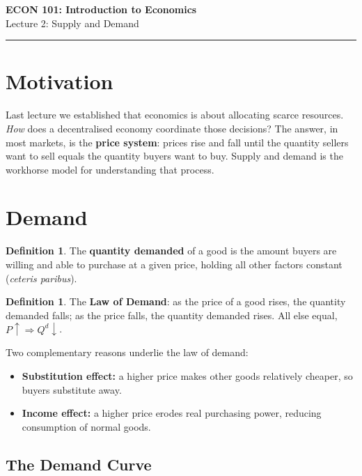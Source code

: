 \documentclass[11pt]{article}
\theoremstyle{definition}
\newtheorem{definition}[theorem]{Definition}
\theoremstyle{remark}
\newcommand{\Qd}{Q^{d}}
\begin{document}
\begin{center}
  {\LARGE\bfseries ECON 101: Introduction to Economics}\\[0.4em]
  {\large Lecture 2: Supply and Demand}
\end{center}
\medskip\hrule\medskip

\section{Motivation}

Last lecture we established that economics is about allocating scarce resources.
\textit{How} does a decentralised economy coordinate those decisions?
The answer, in most markets, is the \textbf{price system}: prices rise and fall
until the quantity sellers want to sell equals the quantity buyers want to buy.
Supply and demand is the workhorse model for understanding that process.

\section{Demand}

\begin{definition}
  The \textbf{quantity demanded} of a good is the amount buyers are willing and
  able to purchase at a given price, holding all other factors constant
  (\textit{ceteris paribus}).
\end{definition}

\begin{definition}
  The \textbf{Law of Demand}: as the price of a good rises, the quantity demanded
  falls; as the price falls, the quantity demanded rises.  All else equal,
  $P \uparrow \Rightarrow \Qd \downarrow$.
\end{definition}

Two complementary reasons underlie the law of demand:
\begin{itemize}
  \item \textbf{Substitution effect:} a higher price makes other goods relatively
    cheaper, so buyers substitute away.
  \item \textbf{Income effect:} a higher price erodes real purchasing power,
    reducing consumption of normal goods.
\end{itemize}

\subsection{The Demand Curve}
\end{document}
